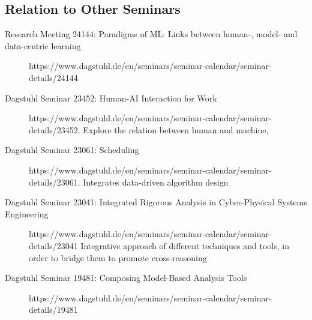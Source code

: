 \subsection{Relation to Other Seminars}
\label{sec:Relations}

\begin{description}
	\item[Research Meeting 24144: Paradigms of ML: Links between human-, model- and data-centric learning] https://www.dagstuhl.de/en/seminars/seminar-calendar/seminar-details/24144
	
	\item[Dagstuhl Seminar 23452: Human-AI Interaction for Work] https://www.dagstuhl.de/en/seminars/seminar-calendar/seminar-details/23452. Explore the relation between human and machine, 
	
	
	\item[Dagstuhl Seminar 23061: Scheduling] https://www.dagstuhl.de/en/seminars/seminar-calendar/seminar-details/23061. Integrates data-driven algorithm design 

	\item[Dagstuhl Seminar 23041: Integrated Rigorous Analysis in Cyber-Physical Systems Engineering] https://www.dagstuhl.de/en/seminars/seminar-calendar/seminar-details/23041
	Integrative approach of different techniques and tools, in order to bridge them to promote cross-reasoning 
	
	\item[Dagstuhl Seminar 19481: Composing Model-Based Analysis Tools] https://www.dagstuhl.de/en/seminars/seminar-calendar/seminar-details/19481
	
	
\end{description}